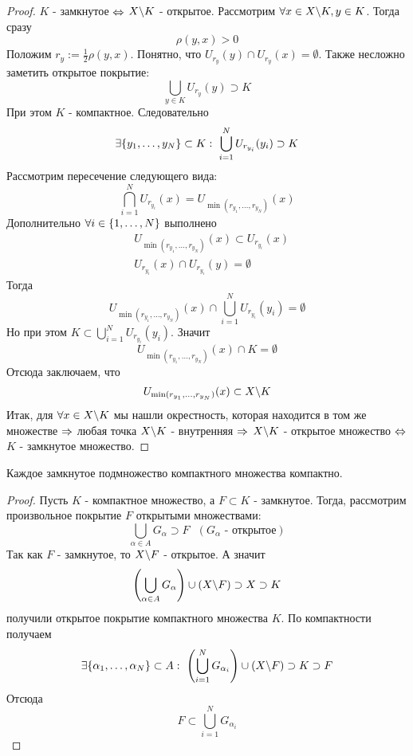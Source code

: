 \begin{proof}
	$K$ - замкнутое $\Leftrightarrow$ $X \backslash K$ - открытое. Рассмотрим $\forall x \in X \backslash K, y \in K$. Тогда сразу
	\[
		\rho(y, x) > 0
	\]
	Положим $r_y := \frac{1}{2}\rho(y, x)$. Понятно, что $U_{r_y}(y) \cap U_{r_y}(x) = \emptyset$. Также несложно заметить открытое покрытие:
	\[
		\bigcup_{y \in K} U_{r_y} (y) \supset K
	\]
	При этом $K$ - компактное. Следовательно
	\[
		\exists \{y_1, \ldots, y_N\} \subset K :\  \bigcup_{i = 1}^N U_{r_{y_i}}(y_i) \supset K
	\]
	Рассмотрим пересечение следующего вида:
	\[
		\bigcap_{i = 1}^N U_{r_{y_i}}(x) = U_{\min(r_{y_1}, \ldots, r_{y_N})}(x)
	\]
	Дополнительно $\forall i \in \{1, \ldots, N\}$ выполнено
	\begin{align*}
		&{U_{\min(r_{y_1}, \ldots, r_{y_N})}(x) \subset U_{r_{y_i}}(x)}
		\\
		&{U_{r_{y_i}}(x) \cap U_{r_{y_i}}(y) = \emptyset}
	\end{align*}
	Тогда
	\[
		U_{\min(r_{y_1}, \ldots, r_{y_N})}(x) \cap \bigcup_{i = 1}^N U_{r_{y_i}}(y_i) = \emptyset
	\]
	Но при этом $K \subset \bigcup\limits_{i = 1}^N U_{r_{y_i}}(y_i)$. Значит
	\[
		U_{\min(r_{y_1}, \ldots, r_{y_N})}(x) \cap K = \emptyset
	\]
	Отсюда заключаем, что
	\[
		U_{\min(r_{y_1}, \ldots, r_{y_N})}(x) \subset X \backslash K
	\]
	Итак, для $\forall x \in X \backslash K$ мы нашли окрестность, которая находится в том же множестве $\Rightarrow$ любая точка $X \backslash K$ - внутренняя $\Rightarrow$ $X \backslash K$ - открытое множество $\Leftrightarrow$ $K$ - замкнутое множество.
\end{proof}

\begin{theorem}
	Каждое замкнутое подмножество компактного множества компактно.
\end{theorem}

\begin{proof}
	Пусть $K$ - компактное множество, а $F \subset K$ - замкнутое. Тогда, рассмотрим произвольное покрытие $F$ открытыми множествами:
	\[
		\bigcup\limits_{\alpha \in A} G_\alpha \supset F\ \ \ (G_\alpha \text{ - открытое})
	\]
	Так как $F$ - замкнутое, то $X \backslash F$ - открытое. А значит
	\[
		\left(\bigcup\limits_{\alpha \in A} G_\alpha\right) \cup (X \backslash F) \supset X \supset K
	\]
	получили открытое покрытие компактного множества $K$. По компактности получаем
	\[
		\exists \{\alpha_1, \ldots, \alpha_N\} \subset A :\  \left(\bigcup\limits_{i = 1}^N G_{\alpha_i}\right) \cup (X \backslash F) \supset K \supset F
	\]
	Отсюда
	\[
		F \subset \bigcup\limits_{i = 1}^N G_{\alpha_i}
	\]
\end{proof}

